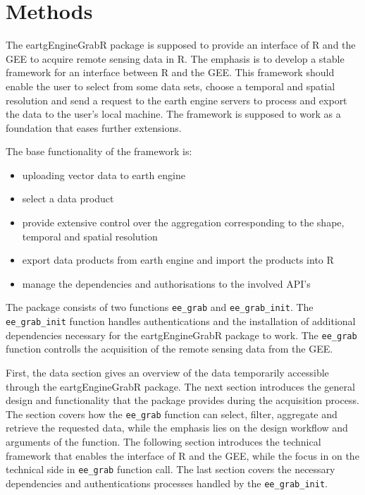 \chapter{Methods}

The eartgEngineGrabR package is supposed to provide an interface of R and the GEE to acquire remote sensing data in R. The emphasis is to develop a stable framework for an interface between R and the GEE. This framework should enable the user to select from some data sets, choose a temporal and spatial resolution and send a request to the earth engine servers to process and export the data to the user's local machine. The framework is supposed to work as a foundation that eases further extensions.

The base functionality of the framework is: 
\begin{itemize}
	\item uploading vector data to earth engine
	\item select a data product
	\item provide extensive control over the aggregation corresponding to the shape, temporal and spatial resolution
	\item export data products from earth engine and import the products into R
	\item manage the dependencies and authorisations to the involved API's
\end{itemize}

The package consists of two functions \texttt{ee\_grab} and \texttt{ee\_grab\_init}. The \texttt{ee\_grab\_init} function handles authentications and the installation of additional dependencies necessary for the eartgEngineGrabR package to work. The \texttt{ee\_grab} function controlls the acquisition of the remote sensing data from the GEE.

First, the data section gives an overview of the data temporarily accessible through the eartgEngineGrabR package. 
The next section introduces the general design and functionality that the package provides during the acquisition process. The section covers how the \texttt{ee\_grab} function can select, filter, aggregate and retrieve the requested data, while the emphasis lies on the design workflow and arguments of the function.
The following section introduces the technical framework that enables the interface of R and the GEE, while the focus in on the technical side in \texttt{ee\_grab} function call.
The last section covers the necessary dependencies and authentications processes handled by the \texttt{ee\_grab\_init}.

